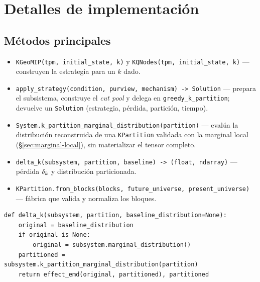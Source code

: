 \documentclass[11pt,letterpaper]{article}
\begin{document}
\section{Detalles de implementación}

\subsection{Métodos principales}
\begin{itemize}
	\item \texttt{KGeoMIP(tpm, initial\_state, k)} y
	      \texttt{KQNodes(tpm, initial\_state, k)} — construyen la estrategia para un
	      $k$ dado.
	\item \texttt{apply\_strategy(condition, purview, mechanism) -> Solution} —
	      prepara el subsistema, construye el \emph{cut pool} y delega en
	      \texttt{greedy\_k\_partition}; devuelve un \texttt{Solution} (estrategia,
	      pérdida, partición, tiempo).
	\item \texttt{System.k\_partition\_marginal\_distribution(partition)} — evalúa la
	      distribución reconstruida de una \texttt{KPartition} validada con la marginal
	      local (§\ref{sec:marginal-local}), sin materializar el tensor completo.
	\item \texttt{delta\_k(subsystem, partition, baseline) -> (float, ndarray)} —
	      pérdida $\delta_k$ y distribución particionada.
	\item \texttt{KPartition.from\_blocks(blocks, future\_universe,
		      present\_universe)} — fábrica que valida y normaliza los bloques.
\end{itemize}

\begin{lstlisting}[style=py,caption={Núcleo de la evaluación $\dk$ (src/funcs/emd.py).},label=lst:deltak]
def delta_k(subsystem, partition, baseline_distribution=None):
    original = baseline_distribution
    if original is None:
        original = subsystem.marginal_distribution()
    partitioned = subsystem.k_partition_marginal_distribution(partition)
    return effect_emd(original, partitioned), partitioned
\end{lstlisting}
\end{document}
